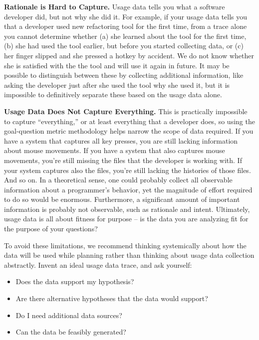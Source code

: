 \documentclass{book}
\begin{document}
\textbf{Rationale is Hard to Capture.}
Usage data tells you what a software developer did, but not
why she did it.
For example, if your usage data tells you that a developer used
new refactoring tool for the first time, from a trace alone you cannot determine whether
(a) she learned about the tool for the first time, (b) she had used the tool earlier, but before you started collecting data, or (c) her finger slipped and she pressed a hotkey by accident. We do not know whether she is satisfied with the the tool and will use it again in future.
It may be possible to distinguish between these by collecting additional information,
like asking the developer just after she used the tool why she used it,
but it is impossible to definitively separate these based on the
usage data alone.

\textbf{Usage Data Does Not Capture Everything.}
This is practically impossible to  capture ``everything,'' or at least
everything that a developer does, so using the
goal-question metric methodology helps narrow the scope of data required.
If you have a system that captures all key presses, you are still
lacking information about mouse movements.
If you have a system that also captures mouse movements, you're still
missing the files that the developer is working with.
If your system captures also the files, you're still lacking the
histories of those files.
And so on.
In a theoretical sense, one could probably collect all observable information
about a programmer's behavior, yet the magnitude of effort required to 
do so would be enormous.
Furthermore, a significant amount of important information is probably not observable,
such as rationale and intent.
Ultimately, usage data is all about fitness for purpose -- is the data
you are analyzing fit for the purpose of your questions?

To avoid these limitations, we recommend thinking systemically about how the data will be used while planning rather than thinking about usage data collection abstractly.
Invent an ideal usage data trace, and ask yourself:

\begin{itemize}[noitemsep]
  \item Does the data support my hypothesis?
  \item Are there alternative hypotheses that the data would support?
  \item Do I need additional data sources?
  \item Can the data be feasibly generated?
\end{itemize}
\end{document}
